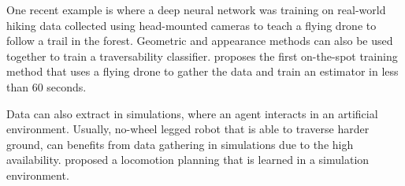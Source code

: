 One recent example is \cite{giusti2015amachine} where a deep neural network was training on real-world hiking data collected using head-mounted cameras to teach a flying drone to follow a trail in the forest. 
Geometric and appearance methods can also be used together to train a traversability classifier. \cite{delmerico2017onthespot} proposes the first on-the-spot training method that uses a flying drone to gather the data and train an estimator in less than 60 seconds. 

Data can also extract in simulations, where an agent interacts in an artificial environment. Usually, no-wheel legged robot that is able to traverse harder ground, can benefits from data gathering in simulations due to the high availability. \cite{tobias2017anytime} proposed a locomotion planning that is learned in a simulation environment. 

